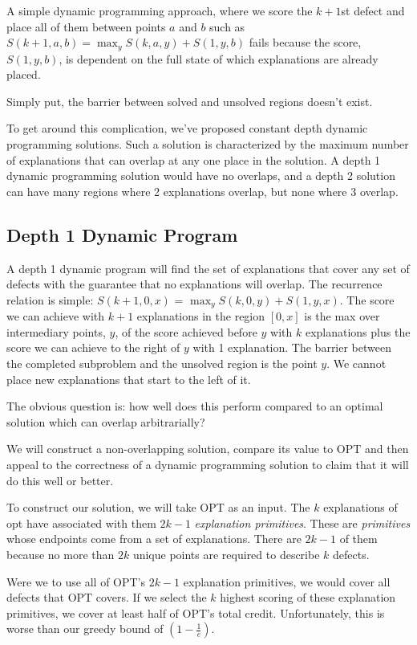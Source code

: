 A simple dynamic programming approach, where we score the $k+1$st defect and place all of them between points $a$ and $b$ such as $S(k+1,a,b) = \max_y S(k,a,y) + S(1,y,b)$ fails because the score, $ S(1,y,b)$, is dependent on the full state of which explanations are already placed.

Simply put, the barrier between solved and unsolved regions doesn't exist.

To get around this complication, we've proposed constant depth dynamic programming solutions.  Such a solution is characterized by the maximum number of explanations that can overlap at any one place in the solution.  A depth 1 dynamic programming solution would have no overlaps, and a depth 2 solution can have many regions where 2 explanations overlap, but none where 3 overlap.

\subsection{Depth 1 Dynamic Program} \label{sec:1DP}

A depth 1 dynamic program will find the set of explanations that cover any set of defects with the guarantee that no explanations will overlap.  The recurrence relation is simple: $S(k+1,0,x)$ = $\max_y S(k,0,y) + S(1,y,x)$.  The score we can achieve with $k+1$ explanations in the region $[0,x]$ is the max over intermediary points, $y$, of the score achieved before $y$ with $k$ explanations plus the score we can achieve to the right of $y$ with 1 explanation. The barrier between the completed subproblem and the unsolved region is the point $y$. We cannot place new explanations that start to the left of it.

The obvious question is: how well does this perform compared to an optimal solution which can overlap arbitrarially?

We will construct a non-overlapping solution, compare its value to OPT and then appeal to the correctness of a dynamic programming solution to claim that it will do this well or better.

To construct our solution, we will take OPT as an input.  The $k$ explanations of opt have associated with them $2k-1$ {\it explanation primitives}.  These are  {\it primitives} whose endpoints come from a set of explanations. There are $2k-1$ of them because no more than $2k$ unique points are required to describe $k$ defects.

Were we to use all of OPT's $2k-1$ explanation primitives, we would cover all defects that OPT covers.  If we select the $k$ highest scoring of these explanation primitives, we cover at least half of OPT's total credit. Unfortunately, this is worse than our greedy bound of $(1- \frac{1}{e})$.


